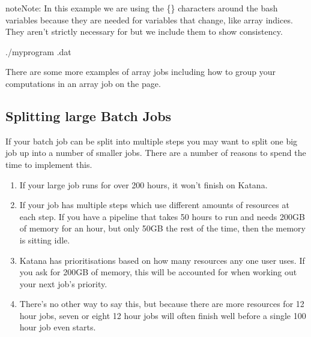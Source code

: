 \documentclass[letterpaper,10pt,english]{sphinxmanual}
\begin{document}
\begin{sphinxadmonition}{note}{Note:}
In this example we are using  \sphinxhyphen{} the \{\} characters around the bash variables \sphinxhyphen{} because they are needed for variables that change, like array indices. They aren’t strictly necessary for  but we include them to show consistency.
\end{sphinxadmonition}

\begin{sphinxVerbatim}[commandchars=\\\{\}]


 

./myprogram .dat
\end{sphinxVerbatim}

There are some more examples of array jobs including how to group your computations in an array job on the  page.


\subsection{Splitting large Batch Jobs}
\label{\detokenize{using_katana/running_jobs:splitting-large-batch-jobs}}
If your batch job can be split into multiple steps you may want to split one big job up into a number of smaller jobs. There are a number of reasons to spend the time to implement this.
\begin{enumerate}
%
\item {} 
If your large job runs for over 200 hours, it won’t finish on Katana.

\item {} 
If your job has multiple steps which use different amounts of resources at each step. If you have a pipeline that takes 50 hours to run and needs 200GB of memory for an hour, but only 50GB the rest of the time, then the memory is sitting idle.

\item {} 
Katana has prioritisations based on how many resources any one user uses. If you ask for 200GB of memory, this will be accounted for when working out your next job’s priority.

\item {} 
There’s no other way to say this, but because there are more resources for 12 hour jobs, seven or eight 12 hour jobs will often finish well before a single 100 hour job even starts.

\end{enumerate}
\end{document}
